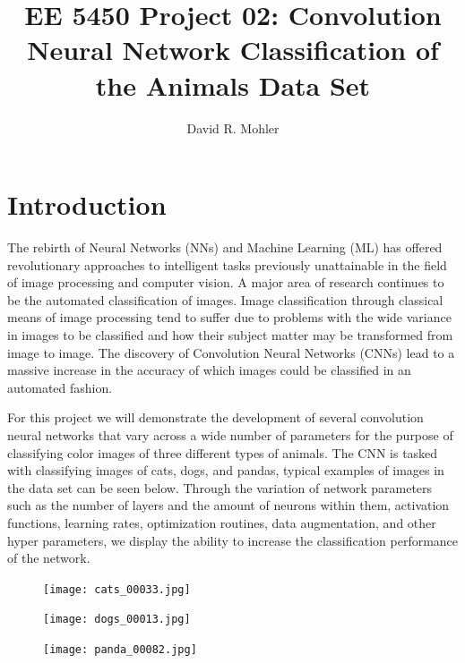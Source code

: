 \documentclass[12pt]{article}
\begin{document}
\title{EE 5450  Project 02: Convolution Neural Network Classification of the Animals Data Set}

\author{David R. Mohler}


\maketitle

\section{Introduction} 
The rebirth of Neural Networks (NNs) and Machine Learning (ML) has offered revolutionary approaches to intelligent tasks previously unattainable in the field of image processing and computer vision. A major area of research continues to be the automated classification of images. Image classification through classical means of image processing tend to suffer due to problems with the wide variance in images to be classified and how their subject matter may be transformed from image to image. The discovery of Convolution Neural Networks (CNNs) lead to a massive increase in the accuracy of which images could be classified in an automated fashion. 

For this project we will demonstrate the development of several convolution neural networks that vary across a wide number of parameters for the purpose of classifying color images of three different types of animals. The CNN is tasked with classifying images of cats, dogs, and pandas, typical examples of images in the data set can be seen below. Through the variation of network parameters such as the number of layers and the amount of neurons within them, activation functions, learning rates, optimization routines, data augmentation, and other hyper parameters, we display the ability to increase the classification performance of the network. 
\begin{figure}[h]
	\centering %
	\captionsetup{justification=centering}
	\begin{minipage}{0.33\textwidth}
		\centering %
		\texttt{[image: cats\_00033.jpg]}
	\end{minipage}\hfill
	\begin{minipage}{0.33\textwidth}
		\centering %
		\texttt{[image: dogs\_00013.jpg]}
	\end{minipage}\hfill
	\begin{minipage}{0.33\textwidth}
		\centering %
		\texttt{[image: panda\_00082.jpg]}
	\end{minipage}\hfill
\end{figure}
\end{document}
